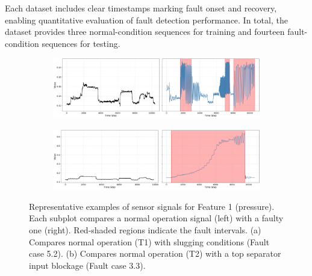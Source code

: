 \documentclass{article}
\begin{document}
Each dataset includes clear timestamps marking fault onset and recovery, enabling quantitative evaluation of fault detection performance. In total, the dataset provides three normal-condition sequences for training and fourteen fault-condition sequences for testing.

\begin{figure}[t]
    \centering
    \begin{subfigure}[b]{0.95\linewidth}
        \centering
        \includegraphics[width=\linewidth]{figures/comparison_F1_T1_vs_FaultyCase5_Set5_2.png}
        \label{fig:sub1}
    \end{subfigure}
    \vspace{1em}
    \begin{subfigure}[b]{0.95\linewidth}
        \centering
        \includegraphics[width=\linewidth]{figures/comparison_F1_T2_vs_FaultyCase3_Set3_3.png}
        \label{fig:sub2}
    \end{subfigure}
    \caption{Representative examples of sensor signals for Feature 1 (pressure). Each subplot compares a normal operation signal (left) with a faulty one (right). Red-shaded regions indicate the fault intervals. (a) Compares normal operation (T1) with slugging conditions (Fault case 5.2). (b) Compares normal operation (T2) with a top separator input blockage (Fault case 3.3).}\label{fig:dataset_examples}
\end{figure}
\end{document}
